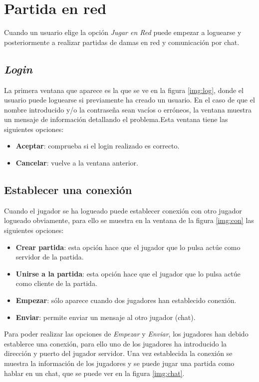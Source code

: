 \section{Partida en red}
Cuando un usuario elige la opción \emph{Jugar en Red} puede empezar a loguearse
 y posteriormente a realizar partidas de damas en red y comunicación por chat.
\subsection{\emph{Login}}
La primera ventana que aparece es la que se ve en la figura \ref{img:log}, donde
el usuario puede loguearse si previamente ha creado un usuario. En el caso de 
que el nombre introducido y/o la contraseña sean vacíos o erróneos, la ventana
muestra un mensaje de información detallando el problema.Esta ventana tiene las
siguientes opciones:
\begin{itemize}
\item \textbf{Aceptar}: comprueba si el login realizado es correcto.
\item \textbf{Cancelar}: vuelve a la ventana anterior.
\end{itemize}

\subsection{Establecer una conexión}
Cuando el jugador se ha logueado puede establecer conexión con otro jugador
logueado obviamente, para ello se muestra en la ventana de la figura 
\ref{img:con} las siguientes opciones:
\begin{itemize}
\item \textbf{Crear partida}: esta opción hace que el jugador que lo pulsa 
actúe como servidor de la partida.
\item \textbf{Unirse a la partida}: esta opción hace que el jugador que lo 
pulsa actúe como cliente de la partida.
\item \textbf{Empezar}: sólo aparece cuando dos jugadores han establecido 
conexión.
\item \textbf{Enviar}: permite enviar un mensaje al otro jugador (chat).
\end{itemize}
Para poder realizar las opciones de \emph{Empezar} y \emph{Enviar}, los 
jugadores han debido establerce una conexión, para ello uno de los jugadores
ha introducido la dirección y puerto del jugador servidor. Una vez establecida
la conexión se muestra la información de los jugadores y se puede jugar una 
partida como hablar en un chat, que se puede ver en la figura \ref{img:chat}.

